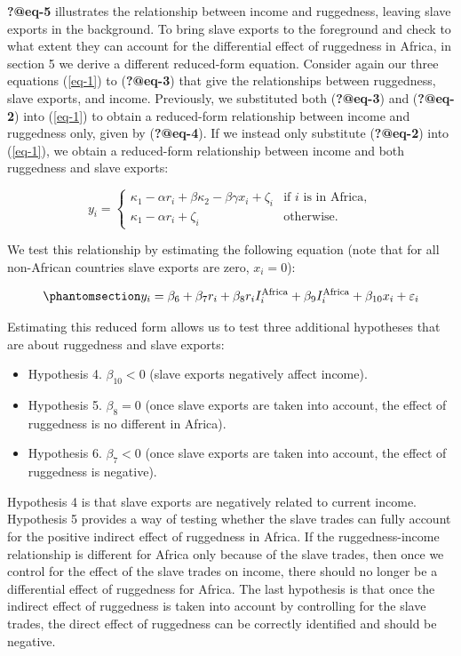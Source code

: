 \documentclass[
  letterpaper,
  DIV=11,
  numbers=noendperiod]{scrartcl}
\providecommand{\tightlist}{%
  \setlength{\itemsep}{0pt}\setlength{\parskip}{0pt}}
\begin{document}
\textbf{?@eq-5} illustrates the relationship between income and
ruggedness, leaving slave exports in the background. To bring slave
exports to the foreground and check to what extent they can account for
the differential effect of ruggedness in Africa, in section 5 we derive
a different reduced-form equation. Consider again our three equations
(\ref{eq-1}) to (\textbf{?@eq-3}) that give the relationships between
ruggedness, slave exports, and income. Previously, we substituted both
(\textbf{?@eq-3}) and (\textbf{?@eq-2}) into (\ref{eq-1}) to obtain a
reduced-form relationship between income and ruggedness only, given by
(\textbf{?@eq-4}). If we instead only substitute (\textbf{?@eq-2}) into
(\ref{eq-1}), we obtain a reduced-form relationship between income and
both ruggedness and slave exports:

\[
y_i = \begin{cases}
\kappa_1 - \alpha r_i + \beta \kappa_2 - \beta \gamma x_i + \zeta_i &\text{if }i\text{ is in Africa}, \\
\kappa_1 - \alpha r_i + \zeta_i &\text{otherwise}.
\end{cases}
\]

We test this relationship by estimating the following equation (note
that for all non-African countries slave exports are zero, \(x_i = 0\)):

\begin{equation}\phantomsection\label{eq-7}{
y_i = \beta_6 + \beta_7 r_i + \beta_8 r_i I_i^\text{Africa} + \beta_9 I_i^\text{Africa} + \beta_{10}x_i + \varepsilon_i
}\end{equation}

Estimating this reduced form allows us to test three additional
hypotheses that are about ruggedness and slave exports:

\begin{itemize}
\tightlist
\item
  Hypothesis 4. \(\beta_{10} < 0\) (slave exports negatively affect
  income).
\item
  Hypothesis 5. \(\beta_8 = 0\) (once slave exports are taken into
  account, the effect of ruggedness is no different in Africa).
\item
  Hypothesis 6. \(\beta_7 < 0\) (once slave exports are taken into
  account, the effect of ruggedness is negative).
\end{itemize}

Hypothesis 4 is that slave exports are negatively related to current
income. Hypothesis 5 provides a way of testing whether the slave trades
can fully account for the positive indirect effect of ruggedness in
Africa. If the ruggedness-income relationship is different for Africa
only because of the slave trades, then once we control for the effect of
the slave trades on income, there should no longer be a differential
effect of ruggedness for Africa. The last hypothesis is that once the
indirect effect of ruggedness is taken into account by controlling for
the slave trades, the direct effect of ruggedness can be correctly
identified and should be negative.
\end{document}
